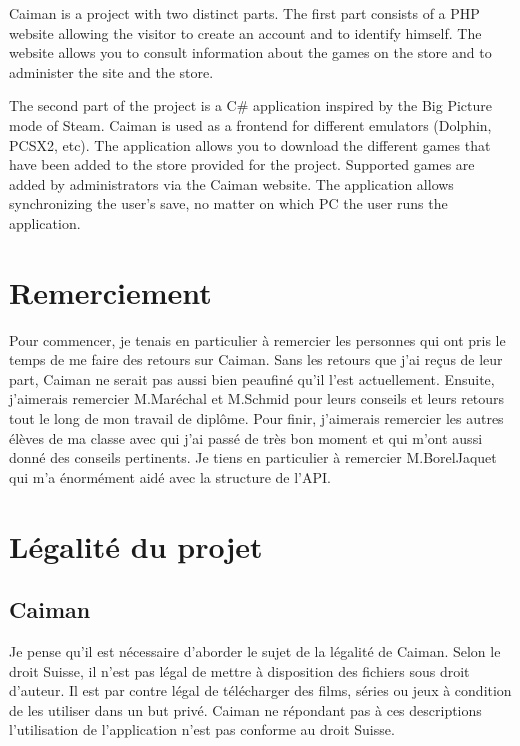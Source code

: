 \documentclass[a4paper,12pt,french]{sphinxmanual}
\begin{document}
\sphinxAtStartPar
Caiman is a project with two distinct parts. The first part consists of a PHP website allowing the visitor to create an account and to identify himself. The website allows you to consult information about the games on the store and to administer the site and the store.

\sphinxAtStartPar
The second part of the project is a C\# application inspired by the Big Picture mode of Steam. Caiman is used as a frontend for different emulators (Dolphin, PCSX2, etc). The application allows you to download the different games that have been added to the store provided for the project. Supported games are added by administrators via the Caiman website. The application allows synchronizing the user’s save, no matter on which PC the user runs the application.


\chapter{Remerciement}
\label{\detokenize{resume:remerciement}}
\sphinxAtStartPar
Pour commencer, je tenais en particulier à remercier les personnes qui ont pris le temps de me faire des retours sur Caiman. Sans les retours que j’ai reçus de leur part, Caiman ne serait pas aussi bien peaufiné qu’il l’est actuellement. Ensuite, j’aimerais remercier M.Maréchal et M.Schmid pour leurs conseils et leurs retours tout le long de mon travail de diplôme. Pour finir, j’aimerais remercier les autres élèves de ma classe avec qui j’ai passé de très bon moment et qui m’ont aussi donné des conseils pertinents. Je tiens en particulier à remercier M.Borel\sphinxhyphen{}Jaquet qui m’a énormément aidé avec la structure de l’API.


\chapter{Légalité du projet}
\label{\detokenize{resume:legalite-du-projet}}

\section{Caiman}
\label{\detokenize{resume:caiman}}
\sphinxAtStartPar
Je pense qu’il est nécessaire d’aborder le sujet de la légalité de Caiman. Selon le droit Suisse, il n’est pas légal de mettre à disposition des fichiers sous droit d’auteur. Il est par contre légal de télécharger des films, séries ou jeux à condition de les utiliser dans un but privé. Caiman ne répondant pas à ces descriptions l’utilisation de l’application n’est pas conforme au droit Suisse.
\end{document}
